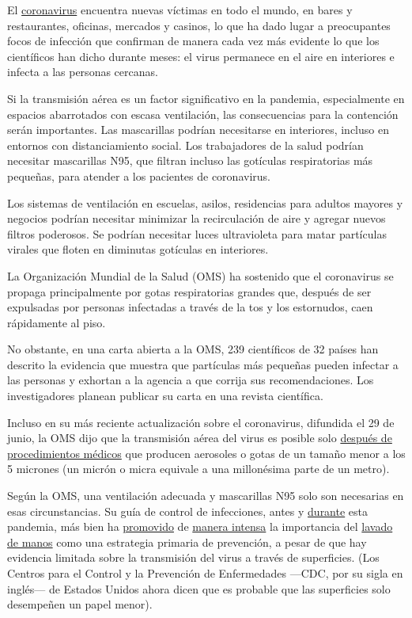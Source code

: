 El
\href{https://www.nytimes.com/2020/07/04/health/coronavirus-neanderthals.html}{coronavirus}
encuentra nuevas víctimas en todo el mundo, en bares y restaurantes,
oficinas, mercados y casinos, lo que ha dado lugar a preocupantes focos
de infección que confirman de manera cada vez más evidente lo que los
científicos han dicho durante meses: el virus permanece en el aire en
interiores e infecta a las personas cercanas.

Si la transmisión aérea es un factor significativo en la pandemia,
especialmente en espacios abarrotados con escasa ventilación, las
consecuencias para la contención serán importantes. Las mascarillas
podrían necesitarse en interiores, incluso en entornos con
distanciamiento social. Los trabajadores de la salud podrían necesitar
mascarillas N95, que filtran incluso las gotículas respiratorias más
pequeñas, para atender a los pacientes de coronavirus.

Los sistemas de ventilación en escuelas, asilos, residencias para
adultos mayores y negocios podrían necesitar minimizar la recirculación
de aire y agregar nuevos filtros poderosos. Se podrían necesitar luces
ultravioleta para matar partículas virales que floten en diminutas
gotículas en interiores.

La Organización Mundial de la Salud (OMS) ha sostenido que el
coronavirus se propaga principalmente por gotas respiratorias grandes
que, después de ser expulsadas por personas infectadas a través de la
tos y los estornudos, caen rápidamente al piso.

No obstante, en una carta abierta a la OMS, 239 científicos de 32 países
han descrito la evidencia que muestra que partículas más pequeñas pueden
infectar a las personas y exhortan a la agencia a que corrija sus
recomendaciones. Los investigadores planean publicar su carta en una
revista científica.

Incluso en su más reciente actualización sobre el coronavirus, difundida
el 29 de junio, la OMS dijo que la transmisión aérea del virus es
posible solo
\href{https://www.who.int/publications/i/item/WHO-2019-nCoV-IPC-2020.4}{después
de procedimientos médicos} que producen aerosoles o gotas de un tamaño
menor a los 5 micrones (un micrón o micra equivale a una millonésima
parte de un metro).

Según la OMS, una ventilación adecuada y mascarillas N95 solo son
necesarias en esas circunstancias. Su guía de control de infecciones,
antes y \href{https://www.who.int/infection-prevention/en/}{durante}
esta pandemia, más bien ha
\href{https://www.who.int/infection-prevention/campaigns/clean-hands/5may2019/en/}{promovido}
de
\href{https://www.who.int/infection-prevention/campaigns/ipc-global-survey-2019/en/}{manera
intensa} la importancia del
\href{https://www.who.int/gpsc/ipc/en/}{lavado de manos} como una
estrategia primaria de prevención, a pesar de que hay evidencia limitada
sobre la transmisión del virus a través de superficies. (Los Centros
para el Control y la Prevención de Enfermedades ---CDC, por su sigla en
inglés--- de Estados Unidos ahora dicen que es probable que las
superficies solo desempeñen un papel menor).

